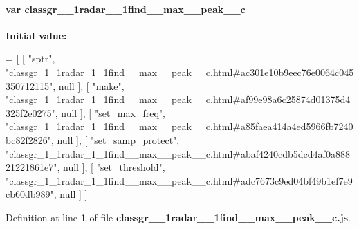 \paragraph[{classgr\+\_\+1\+\_\+1radar\+\_\+1\+\_\+1find\+\_\+\+\_\+max\+\_\+\+\_\+peak\+\_\+\+\_\+c}]{\setlength{\rightskip}{0pt plus 5cm}var classgr\+\_\+\_\+1radar\+\_\+\_\+1find\+\_\+\+\_\+max\+\_\+\+\_\+peak\+\_\+\+\_\+c}\label{classgr__1__1radar__1__1find____max____peak____c_8js_a18e1da863bfb13821e09d44964deb63d}
{\bfseries Initial value\+:}
\begin{DoxyCode}
=
[
    [ \textcolor{stringliteral}{"sptr"}, \textcolor{stringliteral}{"classgr\_1\_1radar\_1\_1find\_\_max\_\_peak\_\_c.html#ac301e10b9eec76e0064c045350712115"}, null ],
    [ \textcolor{stringliteral}{"make"}, \textcolor{stringliteral}{"classgr\_1\_1radar\_1\_1find\_\_max\_\_peak\_\_c.html#af99e98a6c25874d01375d4325f2e0275"}, null ],
    [ \textcolor{stringliteral}{"set\_max\_freq"}, \textcolor{stringliteral}{"classgr\_1\_1radar\_1\_1find\_\_max\_\_peak\_\_c.html#a85faea414a4ed5966fb7240bc82f2826"}, null
       ],
    [ \textcolor{stringliteral}{"set\_samp\_protect"}, \textcolor{stringliteral}{"classgr\_1\_1radar\_1\_1find\_\_max\_\_peak\_\_c.html#abaf4240cdb5dcd4af0a88821221861e7"}, 
      null ],
    [ \textcolor{stringliteral}{"set\_threshold"}, \textcolor{stringliteral}{"classgr\_1\_1radar\_1\_1find\_\_max\_\_peak\_\_c.html#adc7673c9ed04bf49b1ef7e9cb60db989"}, 
      null ]
]
\end{DoxyCode}


Definition at line {\bf 1} of file {\bf classgr\+\_\+\_\+1radar\+\_\+\_\+1find\+\_\+\+\_\+max\+\_\+\+\_\+peak\+\_\+\+\_\+c.\+js}.

